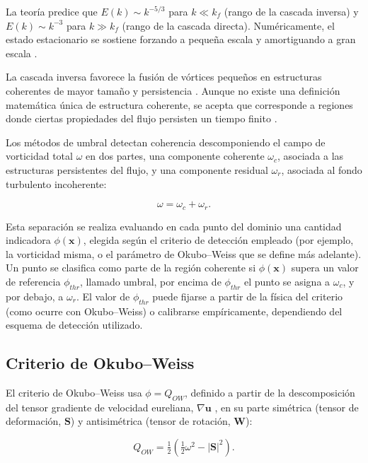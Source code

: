La teoría predice que $E(k)\sim k^{-5/3}$ 
para $k\ll k_f$ (rango de la cascada inversa) y $E(k)\sim k^{-3}$ para $k\gg k_f$ 
(rango de la cascada directa). Numéricamente, el estado estacionario se sostiene 
forzando a pequeña escala y amortiguando a gran escala \cite{vallgren2011,basdevant1994}.

La cascada inversa favorece la fusión de vórtices pequeños en estructuras 
coherentes de mayor tamaño y persistencia \cite{wang2023}. Aunque no existe una 
definición matemática única de estructura coherente, se acepta que corresponde 
a regiones donde ciertas propiedades del flujo persisten un tiempo finito 
\cite{chakraborty2005}.

Los métodos de umbral detectan coherencia descomponiendo el campo de vorticidad 
total $\omega$ en dos partes, una componente coherente $\omega_c$, asociada a las 
estructuras persistentes del flujo, y una componente residual $\omega_r$, 
asociada al fondo turbulento incoherente:

\begin{equation}
\omega = \omega_c + \omega_r.
\label{eq:descomposicion}
\end{equation}

Esta separación se realiza evaluando en cada punto del dominio una cantidad 
indicadora $\phi(\mathbf{x})$, elegida según el criterio de detección empleado 
(por ejemplo, la vorticidad misma, o el parámetro de Okubo--Weiss que se define 
más adelante). Un punto se clasifica como parte de la región coherente si 
$\phi(\mathbf{x})$ supera un valor de referencia $\phi_{thr}$, llamado umbral, 
por encima de $\phi_{thr}$ el punto se asigna a $\omega_c$, y por debajo, a 
$\omega_r$. El valor de $\phi_{thr}$ puede fijarse a partir de la física del 
criterio (como ocurre con Okubo--Weiss) o calibrarse empíricamente, dependiendo 
del esquema de detección utilizado.

\subsection{Criterio de Okubo--Weiss}

El criterio de Okubo--Weiss usa $\phi=Q_{OW}$, definido a partir de la 
descomposición del tensor gradiente de velocidad eureliana, $\nabla \mathbf{u}$ , en su parte simétrica (tensor de deformación, $\mathbf{S}$) 
y antisimétrica (tensor de rotación, $\mathbf{W}$):

\begin{equation}
Q_{OW}=\tfrac{1}{2}\left(\tfrac{1}{2}\omega^2-|\mathbf{S}|^2\right).
\end{equation}


